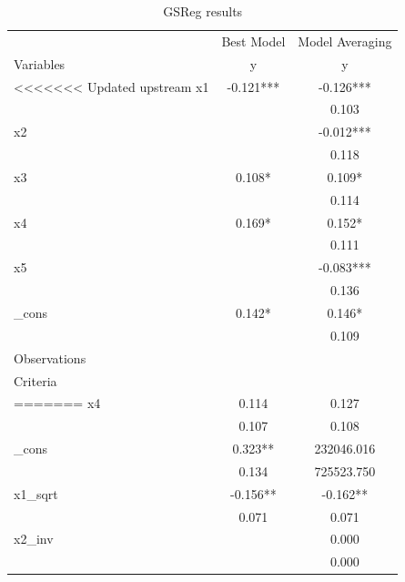 \documentclass{article}
\begin{document}
\begin{table}[!h]
  \centering
  \caption{GSReg results}
    
    \begin{tabular}{l c c}
    \hline
    \hline
                 &  Best Model               & Model Averaging            \\
    Variables    &  y               & y                 \\
    \hline 
<<<<<<< Updated upstream
    x1     & -0.121***  & -0.126***     \\
                 &              & 0.103  \\
     
    x2     &   & -0.012***     \\
                 &              & 0.118  \\
     
    x3     & 0.108*  & 0.109*     \\
                 &              & 0.114  \\
     
    x4     & 0.169*  & 0.152*     \\
                 &              & 0.111  \\
     
    x5     &   & -0.083***     \\
                 &              & 0.136  \\
     
    _cons     & 0.142*  & 0.146*     \\
                 &              & 0.109  \\
    \hline

    Observations &   \multicolumn{ 1  }{c}{ } \\
    Criteria     &   \multicolumn{ 1  }{c}{ } \\
=======
    x4     & 0.114  & 0.127     \\
                 & 0.107        & 0.108  \\
     
    \_cons     & 0.323**  & 232046.016     \\
                 & 0.134        & 725523.750  \\
     
    x1\_sqrt     & -0.156**  & -0.162**     \\
                 & 0.071        & 0.071  \\
     
    x2\_inv     &   & 0.000     \\
                 &         & 0.000  \\
    \hline


\end{tabular}
\end{table}
\end{document}
